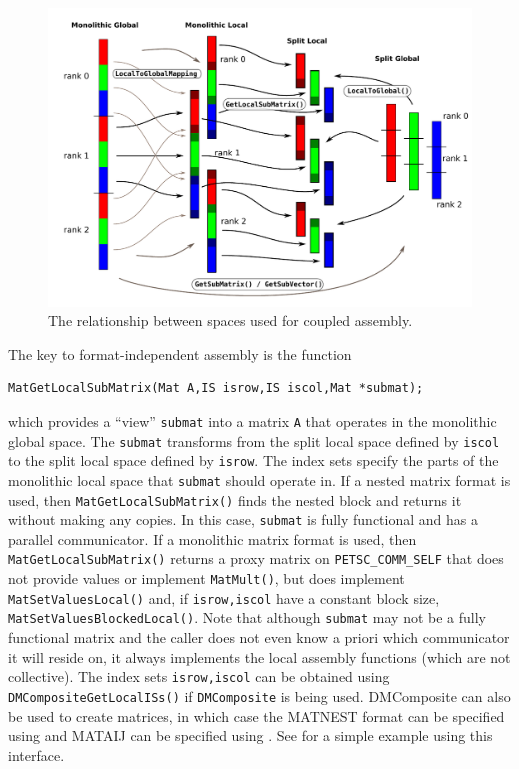 \begin{figure}
\centerline{\includegraphics[width=\textwidth]{localspaces}}
\caption{The relationship between spaces used for coupled assembly.}
\label{fig_localspaces}
\end{figure}

The key to format-independent assembly is the function
\begin{lstlisting}
MatGetLocalSubMatrix(Mat A,IS isrow,IS iscol,Mat *submat);
\end{lstlisting}
which provides a ``view'' \lstinline{submat} into a matrix \lstinline{A} that operates in the monolithic global space.
The \lstinline{submat} transforms from the split local space defined by \lstinline{iscol} to the split local space defined by \lstinline{isrow}.
The index sets specify the parts of the monolithic local space that \lstinline{submat} should operate in.
If a nested matrix format is used, then \lstinline{MatGetLocalSubMatrix()} finds the nested block and returns it without making any copies.
In this case, \lstinline{submat} is fully functional and has a parallel communicator.
If a monolithic matrix format is used, then \lstinline{MatGetLocalSubMatrix()} returns a proxy matrix on \lstinline{PETSC_COMM_SELF} that does not provide values or implement \lstinline{MatMult()}, but does implement \lstinline{MatSetValuesLocal()} and, if \lstinline{isrow,iscol} have a constant block size, \lstinline{MatSetValuesBlockedLocal()}.
Note that although \lstinline{submat} may not be a fully functional matrix and the caller does not even know a priori which communicator it will reside on, it always implements the local assembly functions (which are not collective).
The index sets \lstinline{isrow,iscol} can be obtained using \break\lstinline{DMCompositeGetLocalISs()} if \lstinline{DMComposite} is being used.
DMComposite can also be used to create matrices, in which case the MATNEST format can be specified using  and MATAIJ can be specified using .
See \href{http://www.mcs.anl.gov/petsc/petsc-current/src/snes/examples/tutorials/ex28.c.html}{} for a simple example using this interface.

